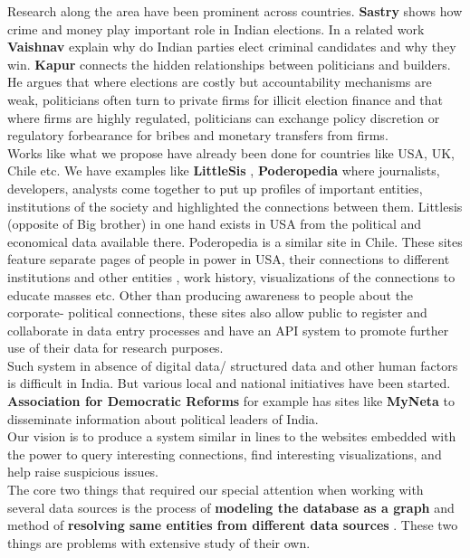 Research along the area have been prominent across countries. \textbf{Sastry} \cite{Sastry} shows how crime and money play important role in Indian elections. In a related work \textbf{Vaishnav} \cite{Essay} explain why do Indian parties elect criminal candidates and why they win. \textbf{Kapur} \cite{Builders} connects the hidden relationships between politicians and builders. He argues that where elections are costly but accountability mechanisms are weak, politicians often turn to private firms for illicit election finance and that where firms are highly regulated, politicians can exchange policy discretion or regulatory forbearance for bribes and monetary transfers from firms. \\

Works like what we propose have already been done for countries like USA, UK, Chile etc. We have examples like \textbf{LittleSis} \cite{LilSis}, \textbf{Poderopedia} \cite{PODERO} where journalists, developers, analysts come together to put up profiles of important entities, institutions of the society and highlighted the connections between them. Littlesis (opposite of Big brother) in one hand exists in USA from the political and economical data available there. Poderopedia is a similar site in Chile. These sites feature separate pages of people in power in USA, their connections to different institutions and other entities , work history, visualizations of the connections to educate masses etc. Other than producing awareness to people about the corporate- political connections, these sites also allow public to register and collaborate in data entry processes and have an API system to promote further use of their data for research purposes. \\

Such system in absence of digital data/ structured data and other human factors is difficult in India. But various local and national initiatives have been started. \textbf{Association for Democratic Reforms} \cite{ADR} for example has sites like \textbf{MyNeta} \cite{MyNeta} to disseminate information about political leaders of India. \\

Our vision is to produce a system similar in lines to the websites embedded with the power to query interesting connections, find interesting visualizations, and help raise suspicious issues. \\

The core two things that required our special attention when working with several data sources is the process of \textbf{ modeling the database as a graph } and method of \textbf{ resolving same entities from different data sources }. These two things are problems with extensive study of their own. \\

